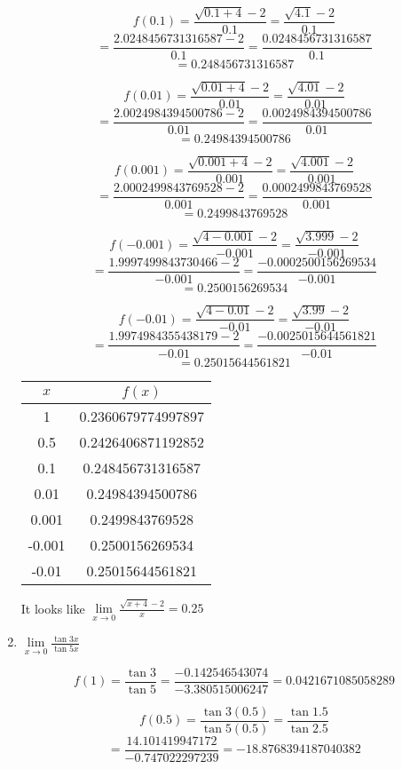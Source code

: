 \documentclass{article}
\begin{document}
\begin{enumerate}
				$$f(0.1) = \frac{\sqrt{0.1 + 4} - 2}{0.1} = \frac{\sqrt{4.1} - 2}{0.1}$$
				$$ = \frac{2.0248456731316587 - 2}{0.1} = \frac{0.0248456731316587}{0.1}$$
				$$ = 0.248456731316587$$
				
				$$f(0.01) = \frac{\sqrt{0.01 + 4}-2}{0.01} = \frac{\sqrt{4.01} - 2}{0.01}$$
				$$= \frac{2.0024984394500786 - 2}{0.01} = \frac{0.0024984394500786}{0.01}$$
				$$ = 0.24984394500786$$
				
				$$f(0.001) = \frac{\sqrt{0.001 + 4}-2}{0.001} = \frac{\sqrt{4.001} -2}{0.001}$$
				$$= \frac{2.0002499843769528-2}{0.001} = \frac{0.0002499843769528}{0.001}$$
				$$ = 0.2499843769528$$
				
				$$f(-0.001) = \frac{\sqrt{4 - 0.001} - 2}{-0.001}  =\frac{\sqrt{3.999} - 2}{-0.001}$$
				$$ = \frac{1.9997499843730466 - 2}{-0.001} = \frac{-0.0002500156269534}{-0.001}$$
				$$ = 0.2500156269534$$
				
				$$f(-0.01) = \frac{\sqrt{4 - 0.01} - 2}{-0.01} = \frac{\sqrt{3.99} - 2}{-0.01}$$
				$$= \frac{1.9974984355438179 - 2}{-0.01} = \frac{-0.0025015644561821}{-0.01}$$
				$$ = 0.25015644561821$$
				
			\begin{center}
				\begin{tabular}{|c|c|}
				\hline
				$x$ & $f(x)$ \\
				\hline \hline
				1 &  0.2360679774997897 \\
				0.5 & 0.2426406871192852 \\
				0.1 &   0.248456731316587 \\
				0.01 &  0.24984394500786 \\
				0.001 & 0.2499843769528 \\
				-0.001 &  0.2500156269534 \\
				-0.01 & 0.25015644561821 \\
				\hline
				\end{tabular}
			\end{center}
			
			It looks like $\lim \limits _{x \to 0} \frac{\sqrt{x + 4} - 2}{x} = 0.25$
			
			\item $\lim \limits _{x \to 0} \frac{\tan 3x}{\tan 5x}$
			
			$$f(1) = \frac{\tan 3}{\tan 5} = \frac{-0.142546543074}{-3.380515006247} = 0.0421671085058289$$
			
			$$f(0.5) = \frac{\tan 3(0.5)}{\tan 5(0.5)} = \frac{\tan 1.5}{\tan 2.5} $$
			$$= \frac{14.101419947172}{-0.747022297239} = -18.8768394187040382$$
			

\end{enumerate}
\end{document}
